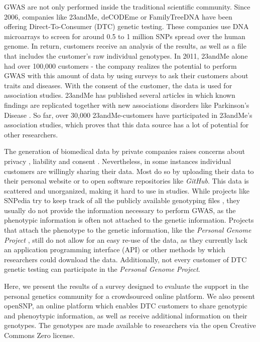 \documentclass[10pt]{article}
\begin{document}
GWAS are not only performed inside the traditional scientific community. 
Since 2006, companies like 23andMe, deCODEme or FamilyTreeDNA have been offering Direct-To-Consumer (DTC) genetic testing. 
These companies use DNA microarrays to screen for around 0.5 to 1 million SNPs spread over the human genome. In return, customers 
receive an analysis of the results, as well as a file that includes the customer's raw individual genotypes. In 2011, 23andMe 
alone had over 100,000 customers \cite{23andMe2011}
- the company realizes the potential to perform GWAS with this amount of data by using surveys to ask their customers about 
traits and diseases. With the consent of the customer, the data is used for association studies. 23andMe has published several 
articles in which known findings are replicated together with new associations disorders like Parkinson's Disease \cite{Eriksson2010, Do2011}. 
So far, over 30,000 23andMe-customers have participated in 23andMe's association studies, which proves that this data source has a lot of potential for other researchers.

The generation of biomedical data by private companies raises concerns about privacy \cite{23andMe2012}, 
liability and consent \cite{Caulfield2011}. 
Nevertheless, in some instances individual customers are willingly sharing their data. Most do so by uploading their data to
their personal website or to open software repositories like \textit{GitHub}. 
This data is scattered and unorganized, making it hard to use in studies. While projects like SNPedia try to keep track of all 
the publicly available genotyping files \cite{Cariaso2011}, they usually do not provide the information necessary to perform GWAS, as the phenotypic information is 
often not attached to the genetic information. Projects that attach the phenotype to the genetic information, 
like the \textit{Personal Genome Project} \cite{Ball24072012}, still do not allow for an easy re-use of the data, as they currently lack an application programming interface (API) 
or other methods by which researchers could download the data. Additionally, not every customer of DTC genetic testing can participate in the \textit{Personal Genome Project}.  

Here, we present the results of a survey designed to evaluate the support in the personal genetics community for a crowdsourced online platform. We also present openSNP, an online platform which enables DTC customers to share genotypic and phenoytypic information, as well as receive additional information on their genotypes. The genotypes are made available to researchers via the open Creative Commons Zero license.
\end{document}
